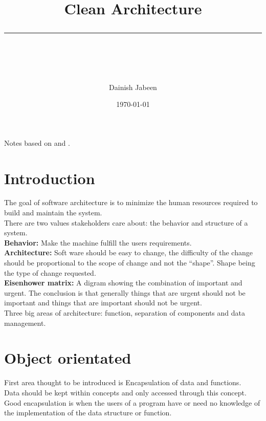 \documentclass[11pt]{scrartcl} %
\title{	
	\normalfont\normalsize
	\vspace{20pt} %
	{\huge Clean Architecture}\\ %
	\vspace{12pt} %
	\rule{\linewidth}{2pt}\\ %
}
\author{\small Dainish Jabeen} %
\date{\normalsize\today} %
\begin{document}
\maketitle %

Notes based on \cite{Martin17} and \cite{richards2020fundamentals}.

\tableofcontents

\pagebreak

\section{Introduction}

The goal of software architecture is to minimize the human resources
required to build and maintain the system.\\

There are two values stakeholders care about: the behavior and structure
of a system.\\

\textbf{Behavior:} Make the machine fulfill the users requirements.\\

\textbf{Architecture:} Soft ware should be easy to change, the
difficulty of the change should be proportional to the scope of change
and not the ``shape''. Shape being the type of change requested.\\

\textbf{Eisenhower matrix:} A digram showing the combination of
important and urgent. The conclusion is that generally things that are
urgent should not be important and things that are important should not
be urgent.\\

Three big areas of architecture: function, separation of components and
data management.

\section{Object orientated}

First area thought to be introduced is Encapsulation of data and
functions.\\

Data should be kept within concepts and only accessed through this
concept.\\

Good encapsulation is when the users of a program have or need no
knowledge of the implementation of the data structure or function.
\end{document}
